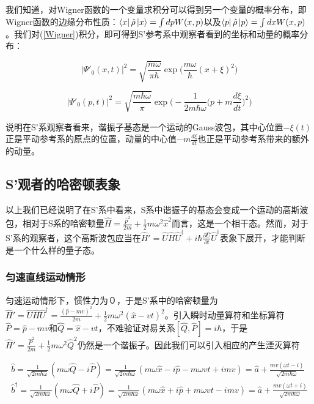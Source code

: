 \documentclass[a4paper]{article}
\begin{document}
        我们知道，对Wigner函数的一个变量求积分可以得到另一个变量的概率分布，即Wigner函数的边缘分布性质：$\bra{x}\hat{\rho}\ket{x}=\int dp W(x, p)$以及$\bra{p}\hat{\rho}\ket{p}=\int dx W(x, p)$。我们对(\ref{Wigner})积分，即可得到S'参考系中观察者看到的坐标和动量的概率分布：

        \begin{equation}
            |\Psi'_0(x,t)|^2 = \sqrt{\frac{m\omega}{\pi\hbar}} \exp\bigg(\frac{m\omega}{\hbar}(x+\xi)^2\bigg)
        \end{equation}

        \begin{equation}
            |\Psi'_0(p,t)|^2 = \sqrt{\frac{m\hbar\omega}{\pi}} \exp\biggl(-\frac{1}{2m\hbar\omega}\bigl(p+m\frac{d\xi}{dt}\bigr)^2\biggr)
        \end{equation}
        
        说明在S'系观察者看来，谐振子基态是一个运动的Gauss波包，其中心位置$-\xi(t)$正是平动参考系的原点的位置，动量的中心值$-m\frac{d\xi}{dt}$也正是平动参考系带来的额外的动量。



    \subsection{S'观者的哈密顿表象}

        以上我们已经说明了在S'系中看来，S系中谐振子的基态会变成一个运动的高斯波包，相对于S系的哈密顿量$\hat{H}=\frac{\hat{p}^2}{2m}+\frac{1}{2}m\omega^2\hat{x}^2$而言，这是一个相干态。然而，对于S'系的观察者，这个高斯波包应当在$\hat{H}'=\hat{U}\hat{H}\hat{U}^\dagger+i\hbar\frac{\partial\hat{U}}{\partial t}\hat{U}^\dagger$表象下展开，才能判断是一个什么样的量子态。

        \subsubsection{匀速直线运动情形}

            匀速运动情形下，惯性力为０，于是S'系中的哈密顿量为$\hat{H}'=\hat{U}\hat{H}\hat{U}^\dagger=\frac{(\hat{p}-mv)^2}{2m}+\frac{1}{2}m\omega^2(\hat{x}-vt)^2$。引入瞬时动量算符和坐标算符$\hat{P}=\hat{p}-mv$和$\hat{Q}=\hat{x}-vt$，不难验证对易关系$[\hat{Q},\hat{P}]=i\hbar$，于是$\hat{H}'=\frac{\hat{P}^2}{2m}+\frac{1}{2}m\omega^2\hat{Q}^2$仍然是一个谐振子。因此我们可以引入相应的产生湮灭算符

            \begin{equation}
                \begin{array}{lr}
                    \hat{b}=\frac{1}{\sqrt{2m\hbar\omega}}(m\omega\hat{Q}-i\hat{P})=\frac{1}{\sqrt{2m\hbar\omega}}(m\omega\hat{x}-i\hat{p}-m\omega vt+imv)=\hat{a}+\frac{mv(\omega t-i)}{\sqrt{2m\hbar\omega}} \\
                    \hat{b}^\dagger=\frac{1}{\sqrt{2m\hbar\omega}}(m\omega\hat{Q}+i\hat{P})=\frac{1}{\sqrt{2m\hbar\omega}}(m\omega\hat{x}+i\hat{p}+m\omega vt-imv)=\hat{a}+\frac{mv(\omega t+i)}{\sqrt{2m\hbar\omega}}
                \end{array}
            \end{equation}
\end{document}
